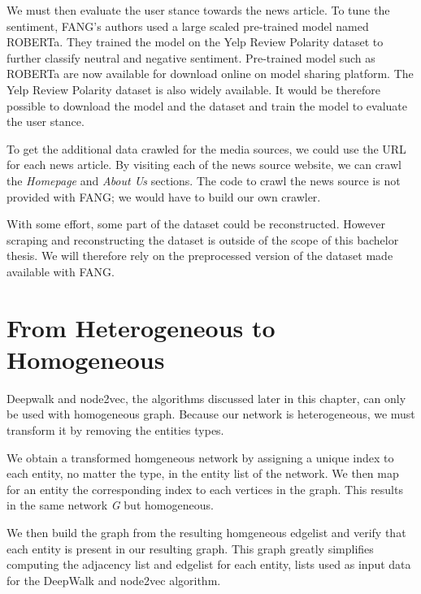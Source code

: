 We must then evaluate the user stance towards the news article.
To tune the sentiment, FANG's authors used a large scaled pre-trained model named ROBERTa. They trained the model on the Yelp Review Polarity dataset to further classify neutral and negative sentiment.
Pre-trained model such as ROBERTa are now available for download online on model sharing platform.
The Yelp Review Polarity dataset is also widely available.
It would be therefore possible to download the model and the dataset and train the model to evaluate the user stance.

To get the additional data crawled for the media sources, we could use the URL for each news article.
By visiting each of the news source website, we can crawl the \textit{Homepage} and \textit{About Us} sections.
The code to crawl the news source is not provided with FANG; we would have to build our own crawler.

With some effort, some part of the dataset could be reconstructed.
However scraping and reconstructing the dataset is outside of the scope of this bachelor thesis.
We will therefore rely on the preprocessed version of the dataset made available with FANG.

\section{From Heterogeneous to Homogeneous}
\label{sub:h2h}

Deepwalk and node2vec, the algorithms discussed later in this chapter, can only be used with homogeneous graph.
Because our network is heterogeneous, we must transform it by removing the entities types.

We obtain a transformed homgeneous network by assigning a unique index to each entity, no matter the type, in the entity list of the network.
We then map for an entity the corresponding index to each vertices in the graph.
This results in the same network \textit{G} but homogeneous.

We then build the graph from the resulting homgeneous edgelist and verify that each entity is present in our resulting graph.
This graph greatly simplifies computing the adjacency list and edgelist for each entity, lists used as input data for the DeepWalk and node2vec algorithm.
